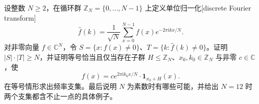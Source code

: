 \begin{optionalexercise}\label{b2:ex:20-new-6}
设整数 \(N\geq2\)，在循环群 \(\mathbb Z_N=\{0,\ldots,N-1\}\) 上定义单位归一化[discrete Fourier transform]
\[
 \widehat f(k)=\frac1{\sqrt N}\sum_{x=0}^{N-1}
                 f(x)e^{-2\pi\mathrm i kx/N}.
\]
对非零向量 \(f\in\mathbb C^N\)，令 \(S=\{x:f(x)\ne0\}\)、\(T=\{k:\widehat f(k)\ne0\}\)。证明 \(|S|\cdot|T|\geq N\)，并证明等号恰当且仅当存在子群 \(H\leq\mathbb Z_N\)、\(x_0,k_0\in\mathbb Z_N\) 与非零 \(c\in\mathbb C\)，使
\[
 f(x)=c e^{2\pi\mathrm i k_0x/N}\cdot\mathbf1_{x_0+H}(x).
\]
在等号情形求出频率支集。最后说明 \(N\) 为素数时有哪些可能，并给出 \(N=12\) 时两个支集都含不止一点的具体例子。
\end{optionalexercise}
